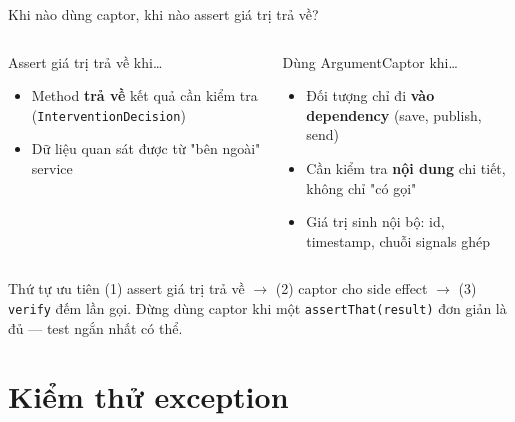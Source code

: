 \documentclass[aspectratio=169,12pt]{beamer}
\begin{document}
\begin{frame}{Khi nào dùng captor, khi nào assert giá trị trả về?}
  \begin{columns}
    \begin{block}{Assert giá trị trả về khi\ldots}
      \begin{itemize}\small
        \item Method \textbf{trả về} kết quả cần kiểm tra
          (\texttt{InterventionDecision})
        \item Dữ liệu quan sát được từ "bên ngoài" service
      \end{itemize}
    \end{block}

    \begin{block}{Dùng ArgumentCaptor khi\ldots}
      \begin{itemize}\small
        \item Đối tượng chỉ đi \textbf{vào dependency} (save, publish, send)
        \item Cần kiểm tra \textbf{nội dung} chi tiết, không chỉ "có gọi"
        \item Giá trị sinh nội bộ: id, timestamp, chuỗi signals ghép
      \end{itemize}
    \end{block}
  \end{columns}

  \medskip
  \begin{alertblock}{Thứ tự ưu tiên}
    (1) assert giá trị trả về $\to$ (2) captor cho side effect $\to$
    (3) \texttt{verify} đếm lần gọi. Đừng dùng captor khi một
    \texttt{assertThat(result)} đơn giản là đủ --- test ngắn nhất có thể.
  \end{alertblock}
\end{frame}

\section{Kiểm thử exception}
\end{document}
